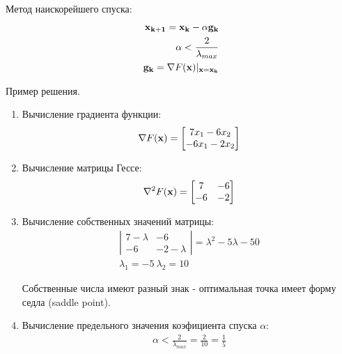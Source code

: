 \documentclass[a4paper]{report}
\begin{document}
Метод наискорейшего спуска:
\begin{eqnarray}
    {\bf x_{k+1}} = {\bf x_k} - \alpha {\bf g_k} \\
    \alpha < \frac{2}{\lambda_{max}} \\
    {\bf g_k} = \nabla F({\bf x}) \vert_{\bf x=x_k}
\end{eqnarray}

Пример решения.

\begin{enumerate}
    \item Вычисление градиента функции:
        \begin{eqnarray}
            \nabla F({\bf x}) =
            \left[
                \begin{matrix}
                    7x_1-6x_2 \\
                    -6x_1-2x_2
                \end{matrix}
            \right]
        \end{eqnarray}

    \item Вычисление матрицы Гессе:
        \begin{eqnarray}
            \nabla^2 F({\bf x}) = \left[
                \begin{matrix}
                    7 & -6 \\
                    -6 & -2
                \end{matrix}
            \right]
        \end{eqnarray}

    \item Вычисление собственных значений матрицы:
        \begin{eqnarray}
           \left| 
                \begin{matrix}
                    7 - \lambda & -6 \\
                    -6 & -2 - \lambda
                \end{matrix}
           \right| = \lambda^2 - 5\lambda - 50 \\
           \lambda_1 = -5 \ \lambda_2 = 10
        \end{eqnarray}

        Собственные числа имеют разный знак - оптимальная точка имеет форму седла (saddle point).

    \item Вычисление предельного значения коэфициента спуска ${\alpha}$:
        \begin{eqnarray}
            \alpha < \frac{2}{\lambda_{max}} = \frac{2}{10} = \frac{1}{5}
        \end{eqnarray}


\end{enumerate}
\end{document}
